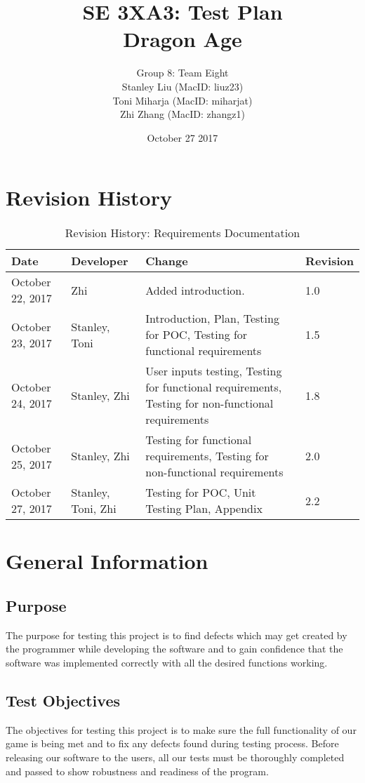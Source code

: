 \documentclass[12,english]{article}
\title{SE 3XA3: Test Plan\\
        Dragon Age}
\author{Group 8: Team Eight \\
                 Stanley Liu (MacID: liuz23) \\    
                 Toni Miharja (MacID: miharjat)\\
                 Zhi Zhang (MacID: zhangz1)}
\date{October 27 2017 }
\begin{document}
\maketitle
\newpage
\tableofcontents
\newpage
 
\section{Revision History}
\begin{table}[h!]
    \centering
    \begin{tabular}{|p{2.5cm}|p{3cm}|p{3cm}|p{2cm}|}
    \hline
    \textbf {Date}  & {Developer} & {Change} & {Revision} \\
    \hline
    October 22, 2017 & Zhi & Added introduction. & 1.0\\
    \hline
    October 23, 2017  & Stanley, Toni &  Introduction, Plan, Testing for POC, Testing for functional requirements & 1.5\\
    \hline
    October 24, 2017  & Stanley, Zhi &  User inputs testing, Testing for functional requirements, Testing for non-functional requirements & 1.8\\
    \hline
    October 25, 2017  & Stanley, Zhi &  Testing for functional requirements, Testing for non-functional requirements & 2.0\\
    \hline
    October 27, 2017  & Stanley, Toni, Zhi & Testing for POC, Unit Testing Plan, Appendix & 2.2\\
    \hline
    \end{tabular}
    \caption{Revision History: Requirements Documentation}
\end{table}
 
\section{General Information}

\subsection{Purpose}
The purpose for testing this project is to find defects which may get created by the programmer while developing the software and to gain confidence that the software was implemented correctly with all the desired functions working. 


\subsection{Test Objectives}
The objectives for testing this project is to make sure the full functionality of our game is being met and to fix any defects found during testing process.  Before releasing our software to the users, all our tests must be thoroughly completed and passed to show robustness and readiness of the program.
\end{document}
